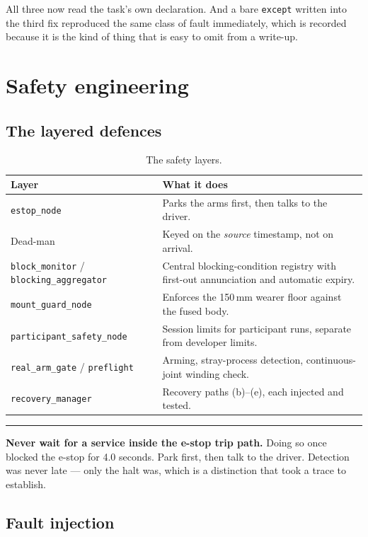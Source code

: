\documentclass[11pt,a4paper,oneside]{report}
\newcommand{\code}[1]{\texttt{\small #1}}
\newcommand{\keyfact}[1]{%
  \par\vspace{7pt}\noindent
  \hspace*{0pt}\textcolor{srlblue}{\rule{2.5pt}{\dimexpr\baselineskip\relax}}%
  \hspace{9pt}%
  \begin{minipage}[t]{\dimexpr\textwidth-14pt\relax}
  \small #1
  \end{minipage}\par\vspace{7pt}}
\begin{document}
All three now read the task's own declaration. And a bare \code{except} written
into the third fix reproduced the same class of fault immediately, which is
recorded because it is the kind of thing that is easy to omit from a write-up.

\chapter{Safety engineering}

\section{The layered defences}

\begin{table}[H]
\centering
\small
\begin{tabularx}{\textwidth}{@{}lX@{}}
\toprule
\textbf{Layer} & \textbf{What it does} \\
\midrule
\code{estop\_node} & Parks the arms first, then talks to the driver. \\
Dead-man & Keyed on the \emph{source} timestamp, not on arrival. \\
\code{block\_monitor} / \code{blocking\_aggregator} & Central blocking-condition
registry with first-out annunciation and automatic expiry. \\
\code{mount\_guard\_node} & Enforces the 150\,mm wearer floor against the fused
body. \\
\code{participant\_safety\_node} & Session limits for participant runs,
separate from developer limits. \\
\code{real\_arm\_gate} / \code{preflight} & Arming, stray-process detection,
continuous-joint winding check. \\
\code{recovery\_manager} & Recovery paths (b)--(e), each injected and tested. \\
\bottomrule
\end{tabularx}
\caption{The safety layers.}
\end{table}

\keyfact{\textbf{Never wait for a service inside the e-stop trip path.} Doing
so once blocked the e-stop for 4.0 seconds. Park first, then talk to the
driver. Detection was never late --- only the halt was, which is a distinction
that took a trace to establish.}

\section{Fault injection}
\end{document}
